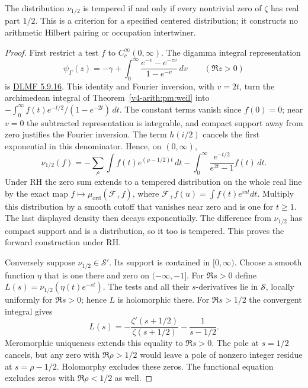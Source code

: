 \begin{theorem}
\label{v4-arith:pm:centered}
The distribution $\nu_{1/2}$ is tempered if and only if every
nontrivial zero of $\zeta$ has real part $1/2$.
This is a criterion for a specified centered distribution; it
constructs no arithmetic Hilbert pairing or occupation intertwiner.
\end{theorem}
\begin{proof}
First restrict a test $f$ to $C_c^\infty(0,\infty)$.
The digamma integral representation
\[
 \psi_\Gamma(z)=-\gamma+
  \int_0^\infty\frac{e^{-v}-e^{-zv}}{1-e^{-v}}\,dv
 \qquad(\Re z>0)
\]
is \href{https://dlmf.nist.gov/5.9.E16}{DLMF 5.9.16}.
This identity
and Fourier inversion, with $v=2t$, turn the archimedean integral
of Theorem~\ref{v4-arith:pm:weil} into
$-\int_0^\infty f(t)e^{-t/2}/(1-e^{-2t})\,dt$.
The constant terms vanish since $f(0)=0$; near $v=0$ the
subtracted representation is integrable, and compact support away
from zero justifies the Fourier inversion. The term $h(i/2)$
cancels the first exponential in this denominator. Hence, on
$(0,\infty)$,
\[
 \nu_{1/2}(f)
 =-\sum_\rho\int f(t)e^{(\rho-1/2)t}\,dt
   -\int_0^\infty\frac{e^{-t/2}}{e^{2t}-1}f(t)\,dt.
\]
Under RH the zero sum extends to a tempered distribution on the
whole real line by the exact map
$f\mapsto\mu_{\mathrm{ord}}(\mathcal F_+f)$, where
$\mathcal F_+f(u)=\int f(t)e^{iut}dt$.
Multiply this distribution by a smooth cutoff that vanishes near
zero and is one for $t\geq1$. The last displayed density then
decays exponentially. The difference from $\nu_{1/2}$ has compact
support and is a distribution, so it too is tempered. This proves
the forward construction under RH.

Conversely suppose $\nu_{1/2}\in\mathscr S'$. Its support is
contained in $[0,\infty)$. Choose a smooth function $\eta$ that
is one there and zero on $(-\infty,-1]$. For $\Re s>0$ define
$L(s)=\nu_{1/2}(\eta(t)e^{-st})$.
The tests and all their $s$-derivatives lie in $\mathscr S$, locally
uniformly for $\Re s>0$; hence $L$ is holomorphic there.
For $\Re s>1/2$ the convergent integral gives
\[
 L(s)=-\frac{\zeta'(s+1/2)}{\zeta(s+1/2)}
                         -\frac1{s-1/2}.
\]
Meromorphic uniqueness extends this equality to $\Re s>0$.
The pole at $s=1/2$ cancels, but any zero with $\Re\rho>1/2$
would leave a pole of nonzero integer residue at $s=\rho-1/2$.
Holomorphy excludes these zeros. The functional equation excludes
zeros with $\Re\rho<1/2$ as well.
\end{proof}

